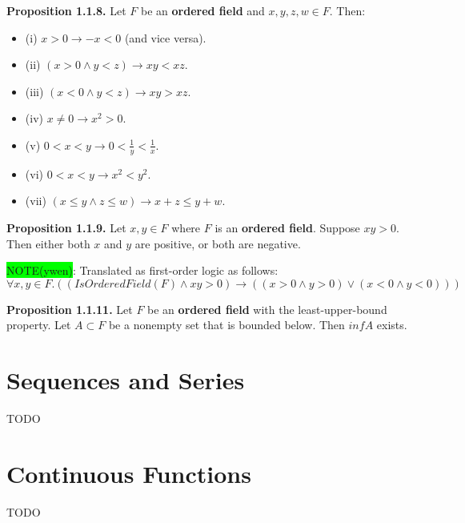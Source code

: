 \documentclass[12pt, letterpaper, oneside]{book}
\begin{document}
\textbf{Proposition 1.1.8.} Let $F$ be an \textbf{ordered field} and $x, y, z, w \in F$. Then:
\begin{itemize}
  \item (i) $x > 0 \rightarrow -x < 0$ (and vice versa).
  \item (ii) $(x > 0 \land y < z) \rightarrow xy < xz$.
  \item (iii) $(x < 0 \land y < z) \rightarrow xy > xz$.
  \item (iv) $x \ne 0 \rightarrow x^2 > 0$.
  \item (v) $0 < x < y \rightarrow 0 < \frac{1}{y} < \frac{1}{x}$.
  \item (vi) $0 < x < y \rightarrow x^2 < y^2$.
  \item (vii) $(x \le y \land z \le w) \rightarrow x + z \le y + w$.
\end{itemize}

\textbf{Proposition 1.1.9.} Let $x, y \in F$ where $F$ is an \textbf{ordered field}. Suppose $xy > 0$. Then either
both $x$ and $y$ are positive, or both are negative.

\colorbox{lime}{NOTE(ywen)}: Translated as first-order logic as follows:
\[ \forall x, y \in F. ((IsOrderedField(F) \land xy > 0) \rightarrow ((x > 0 \land y > 0) \lor (x < 0 \land y < 0))) \]

\textbf{Proposition 1.1.11.} Let $F$ be an \textbf{ordered field} with the least-upper-bound property. Let $A \subset F$
be a nonempty set that is bounded below. Then $inf A$ exists.

%
%

\chapter{Sequences and Series}

TODO

%
%

\chapter{Continuous Functions}

TODO
\end{document}
